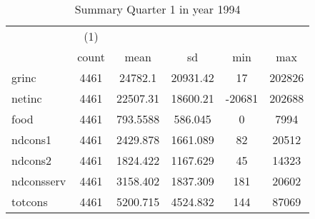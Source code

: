 \begin{table}[htbp]\centering
\def\sym#1{\ifmmode^{#1}\else\(^{#1}\)\fi}
\caption{Summary Quarter 1 in year 1994 \label{sum\_Q1\_y1994}}
\begin{tabular}{l*{1}{ccccc}}
\hline\hline
            &\multicolumn{1}{c}{(1)}&            &            &            &            \\
            &       count&        mean&          sd&         min&         max\\
\hline
grinc       &        4461&     24782.1&    20931.42&          17&      202826\\
netinc      &        4461&    22507.31&    18600.21&      -20681&      202688\\
food        &        4461&    793.5588&     586.045&           0&        7994\\
ndcons1     &        4461&    2429.878&    1661.089&          82&       20512\\
ndcons2     &        4461&    1824.422&    1167.629&          45&       14323\\
ndconsserv  &        4461&    3158.402&    1837.309&         181&       20602\\
totcons     &        4461&    5200.715&    4524.832&         144&       87069\\
\hline\hline
\end{tabular}
\end{table}
